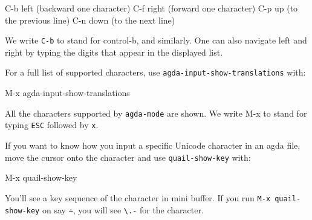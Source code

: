 \begin{myDisplay}
C-b  left (backward one character)
C-f  right (forward one character)
C-p  up (to the previous line)
C-n  down (to the next line)
\end{myDisplay}

We write \texttt{C-b} to stand for control-b, and similarly. One can
also navigate left and right by typing the digits that appear in the
displayed list.

For a full list of supported characters, use
\texttt{agda-input-show-translations} with:

\begin{myDisplay}
M-x agda-input-show-translations
\end{myDisplay}

All the characters supported by \texttt{agda-mode} are shown. We write
M-x to stand for typing \texttt{ESC} followed by \texttt{x}.

If you want to know how you input a specific Unicode character in an
agda file, move the cursor onto the character and use
\texttt{quail-show-key} with:

\begin{myDisplay}
M-x quail-show-key
\end{myDisplay}

You'll see a key sequence of the character in mini buffer. If you run
\texttt{M-x\ quail-show-key} on say \texttt{∸}, you will see
\texttt{\textbackslash{}.-} for the character.

